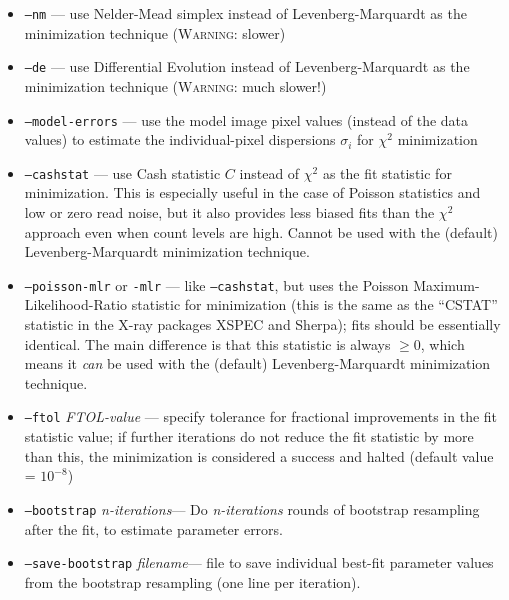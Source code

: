 \documentclass[10pt,a4paper,article]{memoir}
\newcommand{\chisquare}{\ensuremath{\chi^{2}}}
\begin{document}
\begin{itemize}
\bigskip

\item \texttt{--nm} --- use Nelder-Mead simplex instead of Levenberg-Marquardt as
the minimization technique (\textsc{Warning}: slower)
\item \texttt{--de} --- use Differential Evolution instead of Levenberg-Marquardt as
the minimization technique (\textsc{Warning}: much slower!)

\bigskip

\item \texttt{--model-errors} --- use the model image pixel values
(instead of the data values) to estimate the individual-pixel dispersions
$\sigma_{i}$ for \chisquare{} minimization

\item \texttt{--cashstat} --- use Cash statistic $C$ instead of \chisquare{}
as the fit statistic for minimization. This is especially useful in the
case of Poisson statistics and low or zero read noise, but it also provides less
biased fits than the \chisquare{} approach even when count levels are
high. Cannot be used with the (default) Levenberg-Marquardt minimization
technique.

\item \texttt{--poisson-mlr} or \texttt{-mlr} --- like \texttt{--cashstat}, but uses the
Poisson Maximum-Likelihood-Ratio statistic for minimization (this is
the same as the ``CSTAT'' statistic in the X-ray packages XSPEC and
Sherpa); fits should be essentially identical. The main difference is that this statistic is
always $\ge 0$, which means it \textit{can} be used with the (default)
Levenberg-Marquardt minimization technique.

\item \texttt{--ftol} \textit{FTOL-value} --- specify tolerance for
fractional improvements in the fit statistic value; if further iterations do 
not reduce the fit statistic by more than this, the minimization is considered a 
success and halted (default value = $10^{-8}$)

\bigskip

\item \texttt{--bootstrap} \textit{n-iterations}--- Do \textit{n-iterations} rounds
of bootstrap resampling after the fit, to estimate parameter errors.

\item \texttt{--save-bootstrap} \textit{filename}--- file to save
individual best-fit parameter values from the bootstrap resampling (one
line per iteration).


\end{itemize}
\end{document}
